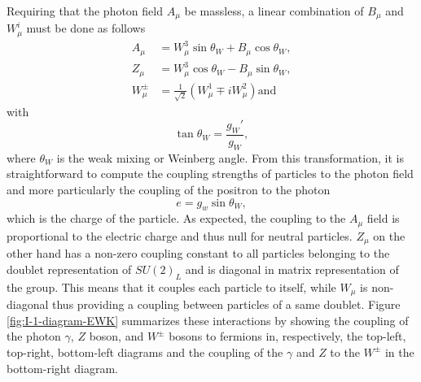     Requiring that the photon field $ A_\mu $ be massless, a linear combination of $ B_\mu $ and $ W^i_\mu $ must be done as follows
    \begin{align}
      A_\mu & = W^3_\mu \sin \theta_W + B_\mu \cos \theta_W , \\
      Z_\mu & = W^3_\mu \cos \theta_W - B_\mu \sin \theta_W , \\
      W^\pm_\mu & = \frac{1}{\sqrt{2}} \left( W^1_\mu \mp i W^2_\mu \right) \text{and}
    \end{align}
    with
    \begin{equation}
      \tan \theta_W = \frac{g_W'}{g_W} ,
    \end{equation}
    where $ \theta_W $ is the weak mixing or Weinberg angle. From this transformation, it is straightforward to compute the coupling strengths of particles to the photon field and more particularly the coupling of the positron to the photon
    \begin{equation}
      e = g_w \sin \theta_W ,
    \end{equation}
    which is the charge of the particle. As expected, the coupling to the $ A_\mu $ field is proportional to the electric charge and thus null for neutral particles. $ Z_\mu $ on the other hand has a non-zero coupling constant to all particles belonging to the doublet representation of $ SU(2)_L $ and is diagonal in matrix representation of the group. This means that it couples each particle to itself, while $ W_\mu $ is non-diagonal thus providing a coupling between particles of a same doublet. Figure \ref{fig:I-1-diagram-EWK} summarizes these interactions by showing the coupling of the photon $ \gamma $, $ Z $ boson, and $ W^\pm $ bosons to fermions in, respectively, the top-left, top-right, bottom-left diagrams and the coupling of the $ \gamma $ and $ Z $ to the $ W^\pm $ in the bottom-right diagram.

